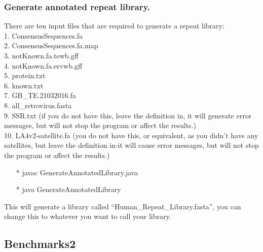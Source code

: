 \documentclass[12pt]{report}
\begin{document}
\subsubsection*{Generate annotated repeat library.}
There are ten input files that are required to generate a repeat library: \\
1. ConsensusSequences.fa \\
2. ConsensusSequences.fa.map \\
3. notKnown.fa.tewb.gff \\
4. notKnown.fa.ervwb.gff \\
5. protein.txt \\
6. known.txt \\
7. GB\_TE.21032016.fa \\
8. all\_retrovirus.fasta \\
9. SSR.txt (if you do not have this, leave the definition in, it will generate error messages, but will not stop the program or affect the results.) \\
10. LA4v2-satellite.fa (you do not have this, or equivalent, as you didn't have any satellites, but leave the definition in-it will cause error messages, but will not stop the program or affect the results.)
\begin{enumerate}
	\item[*] javac GenerateAnnotatedLibrary.java
	\item[*] java GenerateAnnotatedLibrary
\end{enumerate}
This will generate a library called \textquotedblleft*Human\_Repeat\_Library.fasta\textquotedblright, you can change this to whatever you want to call your library.

\subsection*{Benchmarks2}
\end{document}
